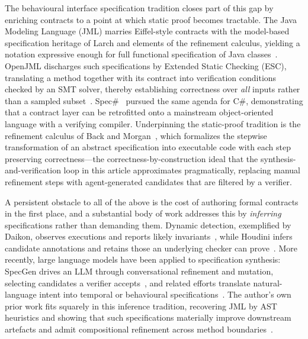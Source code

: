 The behavioural interface specification tradition closes part of this gap by enriching contracts to a point at which static proof becomes tractable. The Java Modeling Language (JML) marries Eiffel-style contracts with the model-based specification heritage of Larch and elements of the refinement calculus, yielding a notation expressive enough for full functional specification of Java classes~\cite{leavens2006jml}. OpenJML discharges such specifications by Extended Static Checking (ESC), translating a method together with its contract into verification conditions checked by an SMT solver, thereby establishing correctness over \emph{all} inputs rather than a sampled subset~\cite{cok2011openjml,cok2014openjml}. Spec\#~\cite{barnett2005specsharp} pursued the same agenda for C\#, demonstrating that a contract layer can be retrofitted onto a mainstream object-oriented language with a verifying compiler. Underpinning the static-proof tradition is the refinement calculus of Back and Morgan~\cite{back1998refinement,morgan1994programming}, which formalizes the stepwise transformation of an abstract specification into executable code with each step preserving correctness---the correctness-by-construction ideal that the synthesis-and-verification loop in this article approximates pragmatically, replacing manual refinement steps with agent-generated candidates that are filtered by a verifier.

A persistent obstacle to all of the above is the cost of authoring formal contracts in the first place, and a substantial body of work addresses this by \emph{inferring} specifications rather than demanding them. Dynamic detection, exemplified by Daikon, observes executions and reports likely invariants~\cite{ernst2007daikon}, while Houdini infers candidate annotations and retains those an underlying checker can prove~\cite{flanagan2001houdini}. More recently, large language models have been applied to specification synthesis: SpecGen drives an LLM through conversational refinement and mutation, selecting candidates a verifier accepts~\cite{ma2025specgen}, and related efforts translate natural-language intent into temporal or behavioural specifications~\cite{cosler2023nl2spec}. The author's own prior work fits squarely in this inference tradition, recovering JML by AST heuristics and showing that such specifications materially improve downstream artefacts and admit compositional refinement across method boundaries~\cite{edmonds_article1,edmonds_article3}.

